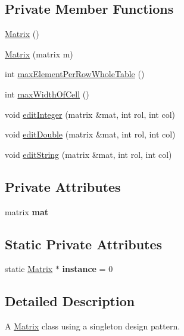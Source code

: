 \subsection*{Private Member Functions}
\begin{DoxyCompactItemize}
\item 
\hyperlink{class_matrix_a2dba13c45127354c9f75ef576f49269b}{Matrix} ()
\item 
\hyperlink{class_matrix_abc64f3d5a4f22323a24be2bfabf377cb}{Matrix} (matrix m)
\item 
int \hyperlink{class_matrix_a8620c5426a31cf8fe0072df32bb3f65d}{max\+Element\+Per\+Row\+Whole\+Table} ()
\item 
int \hyperlink{class_matrix_a60dac9b70e73a12d2adb32d6be9ff65d}{max\+Width\+Of\+Cell} ()
\item 
void \hyperlink{class_matrix_a9bbbaee1b96cc6dc5e4255a0400a5e61}{edit\+Integer} (matrix \&mat, int rol, int col)
\item 
void \hyperlink{class_matrix_af8adf979beb20569c06fd529879870b0}{edit\+Double} (matrix \&mat, int rol, int col)
\item 
void \hyperlink{class_matrix_a3c385c2a6ad67a34306c81a4087789b3}{edit\+String} (matrix \&mat, int rol, int col)
\end{DoxyCompactItemize}
\subsection*{Private Attributes}
\begin{DoxyCompactItemize}
\item 
\mbox{\label{class_matrix_a1b0c75c45092426431308172aab92c66}} 
matrix {\bfseries mat}
\end{DoxyCompactItemize}
\subsection*{Static Private Attributes}
\begin{DoxyCompactItemize}
\item 
\mbox{\label{class_matrix_adbe13eefa6a6ea2f02f45da26400f22e}} 
static \hyperlink{class_matrix}{Matrix} $\ast$ {\bfseries instance} = 0
\end{DoxyCompactItemize}


\subsection{Detailed Description}
A \hyperlink{class_matrix}{Matrix} class using a singleton design pattern. 


